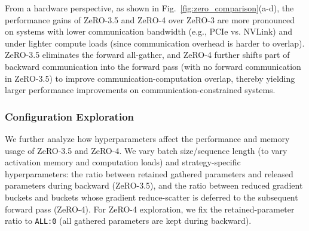 \documentclass[letterpaper,twocolumn,10pt]{article}
\begin{document}

From a hardware perspective, as shown in Fig.~\ref{fig:zero_comparison}(a-d), the performance gains of ZeRO-3.5 and ZeRO-4 over ZeRO-3 are more pronounced on systems with lower communication bandwidth (e.g., PCIe vs. NVLink) and under lighter compute loads (since communication overhead is harder to overlap). ZeRO-3.5 eliminates the forward all-gather, and ZeRO-4 further shifts part of backward communication into the forward pass (with no forward communication in ZeRO-3.5) to improve communication-computation overlap, thereby yielding larger performance improvements on communication-constrained systems.

\subsubsection{Configuration Exploration}

We further analyze how hyperparameters affect the performance and memory usage of ZeRO-3.5 and ZeRO-4. We vary batch size/sequence length (to vary activation memory and computation loads) and strategy-specific hyperparameters: the ratio between retained gathered parameters and released parameters during backward (ZeRO-3.5), and the ratio between reduced gradient buckets and buckets whose gradient reduce-scatter is deferred to the subsequent forward pass (ZeRO-4). For ZeRO-4 exploration, we fix the retained-parameter ratio to \texttt{ALL:0} (all gathered parameters are kept during backward).
\end{document}
